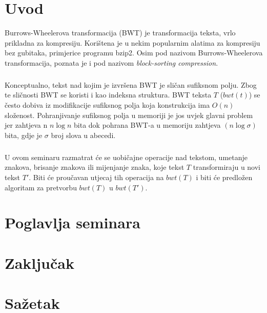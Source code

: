 \documentclass{ferseminar}
\begin{document}
\stvoripredstranice
\section{Uvod}
Burrows-Wheelerova transformacija (BWT) je transformacija teksta, vrlo prikladna za kompresiju. Korištena je u nekim popularnim alatima za kompresiju bez gubitaka, primjerice programu bzip2.  Osim pod nazivom Burrows-Wheelerova transformacija, poznata je i pod nazivom \textit{block-sorting compression}. 
\subparagraph{}
Konceptualno, tekst nad kojim je izvršena BWT je sličan sufiksnom polju. Zbog te sličnosti BWT se koristi i kao indeksna struktura. BWT teksta $T$ ($bwt(t)$) se često dobiva iz modifikacije sufiksnog polja koja konstrukcija ima $O(n)$ složenost. Pohranjivanje sufiksnog polja u memoriji je jos uvjek glavni problem jer zahtjeva n $n\log{}n$ bita dok pohrana BWT-a u memoriju zahtjeva $(n\log{}\sigma)$ bita, gdje je $\sigma$ broj slova u abecedi.
\subparagraph{}
U ovom seminaru razmatrat će se uobičajne operacije nad tekstom, umetanje znakova, brisanje znakova ili mijenjanje znaka, koje tekst $T$ transformiraju u novi tekst $T'$. Biti će proučavan utjecaj tih operacija na $bwt(T)$ i biti će predložen algoritam za pretvorbu $bwt(T)$ u $bwt(T')$.

\section{Poglavlja seminara}

\section{Zaključak}
\section{Sažetak}
\end{document}
